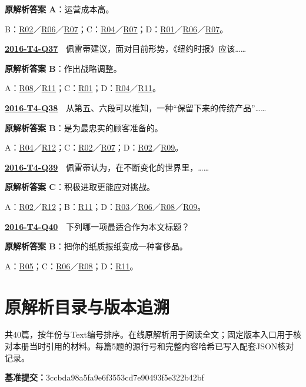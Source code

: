 \documentclass[11pt,a4paper]{article}
\begin{document}
\noindent\textbf{原解析答案 A}：运营成本高。\par\nopagebreak
\noindent B：\hyperref[cat-R02]{R02}／\hyperref[cat-R06]{R06}／\hyperref[cat-R07]{R07}；C：\hyperref[cat-R04]{R04}／\hyperref[cat-R07]{R07}；D：\hyperref[cat-R01]{R01}／\hyperref[cat-R06]{R06}／\hyperref[cat-R07]{R07}。\par\smallskip
{}\label{idx-2016-T4-Q37}\noindent\textbf{\href{https://zj139.github.io/math-notes/english/52a512b347cf9f366ac3f189/\#q37}{2016-T4-Q37}}　佩雷蒂建议，面对目前形势，《纽约时报》应该……\par\nopagebreak
\noindent\textbf{原解析答案 B}：作出战略调整。\par\nopagebreak
\noindent A：\hyperref[cat-R08]{R08}／\hyperref[cat-R11]{R11}；C：\hyperref[cat-R01]{R01}；D：\hyperref[cat-R04]{R04}／\hyperref[cat-R11]{R11}。\par\smallskip
{}\label{idx-2016-T4-Q38}\noindent\textbf{\href{https://zj139.github.io/math-notes/english/52a512b347cf9f366ac3f189/\#q38}{2016-T4-Q38}}　从第五、六段可以推知，一种“保留下来的传统产品”……\par\nopagebreak
\noindent\textbf{原解析答案 B}：是为最忠实的顾客准备的。\par\nopagebreak
\noindent A：\hyperref[cat-R04]{R04}／\hyperref[cat-R12]{R12}；C：\hyperref[cat-R02]{R02}／\hyperref[cat-R07]{R07}；D：\hyperref[cat-R02]{R02}／\hyperref[cat-R09]{R09}。\par\smallskip
{}\label{idx-2016-T4-Q39}\noindent\textbf{\href{https://zj139.github.io/math-notes/english/52a512b347cf9f366ac3f189/\#q39}{2016-T4-Q39}}　佩雷蒂认为，在不断变化的世界里，……\par\nopagebreak
\noindent\textbf{原解析答案 C}：积极进取更能应对挑战。\par\nopagebreak
\noindent A：\hyperref[cat-R02]{R02}／\hyperref[cat-R12]{R12}；B：\hyperref[cat-R11]{R11}；D：\hyperref[cat-R03]{R03}／\hyperref[cat-R06]{R06}／\hyperref[cat-R08]{R08}／\hyperref[cat-R09]{R09}。\par\smallskip
{}\label{idx-2016-T4-Q40}\noindent\textbf{\href{https://zj139.github.io/math-notes/english/52a512b347cf9f366ac3f189/\#q40}{2016-T4-Q40}}　下列哪一项最适合作为本文标题？\par\nopagebreak
\noindent\textbf{原解析答案 B}：把你的纸质报纸变成一种奢侈品。\par\nopagebreak
\noindent A：\hyperref[cat-R05]{R05}；C：\hyperref[cat-R06]{R06}／\hyperref[cat-R08]{R08}；D：\hyperref[cat-R11]{R11}。\par\smallskip
\clearpage\section{原解析目录与版本追溯}\label{sources}
共40篇，按年份与Text编号排序。在线原解析用于阅读全文；固定版本入口用于核对本册当时引用的材料。每篇5题的源行号和完整内容哈希已写入配套JSON核对记录。\par
\noindent\textbf{基准提交：}3ccbda98a5fa9e6f3553cd7e90493f5e322b42bf\par
{}
\end{document}
